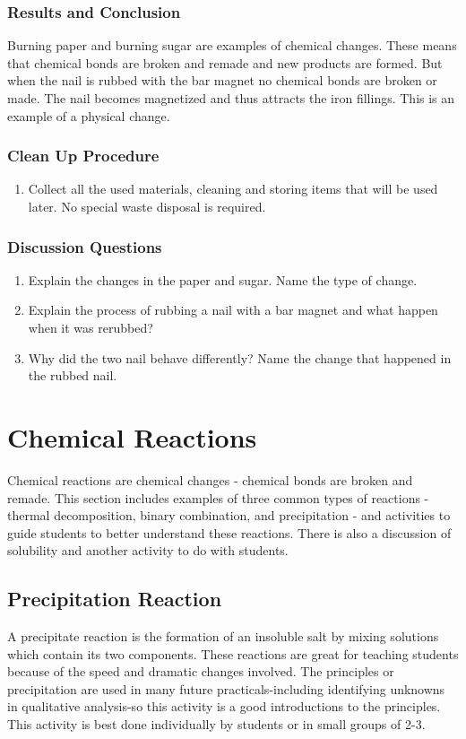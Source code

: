\subsubsection*{Results and Conclusion}
Burning paper and burning sugar are examples of chemical changes. These means that chemical bonds are broken and remade and new products are formed. But when the nail is rubbed with the bar magnet no chemical bonds are broken or made. The nail becomes magnetized and thus attracts the iron fillings. This is an example of a physical change.

\subsubsection*{Clean Up Procedure}
\begin{enumerate}
\item{Collect all the used materials, cleaning and storing items that will be used later. No special waste disposal is required.}
\end{enumerate}

\subsubsection*{Discussion Questions}
\begin{enumerate}
\item{Explain the changes in the paper and sugar. Name the type of change.}
\item{Explain the process of rubbing a nail with a bar magnet and what happen when it was rerubbed?}
\item{Why did the two nail behave differently? Name the change that happened in the rubbed nail.}
\end{enumerate}


\section{ Chemical Reactions}
Chemical reactions are chemical changes - chemical bonds are broken and remade. This section includes examples of three common types of reactions - thermal decomposition, binary combination, and precipitation - and activities to guide students to better understand these reactions. There is also a discussion of solubility and another activity to do with students.
\subsection{Precipitation Reaction}
A precipitate reaction is the formation of an insoluble salt by mixing solutions which contain its two components. These reactions are great for teaching students because of the speed and dramatic changes involved. The principles or precipitation are used in many future practicals-including identifying unknowns in qualitative analysis-so this activity is a good introductions to the principles. This activity is best done individually by students or in small groups of 2-3. 


